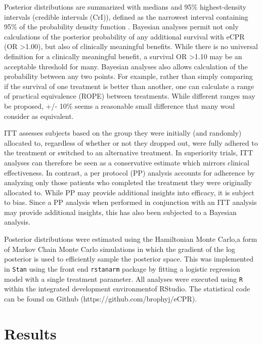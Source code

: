 \documentclass[
  super,
  preprint,
  3p]{elsarticle}
\begin{document}
Posterior distributions are summarized with medians and 95\%
highest-density intervals (credible intervals (CrI)), defined as the
narrowest interval containing 95\% of the probability density function
\citep{mcelreath2020}. Bayesian analyses permit not only calculations of
the posterior probability of any additional survival with eCPR (OR
\textgreater1.00), but also of clinically meaningful benefits. While
there is no universal definition for a clinically meaningful benefit, a
survival OR \textgreater1.10 may be an acceptable threshold for many.
Bayesian analyses also allows calculation of the probability between any
two points. For example, rather than simply comparing if the survival of
one treatment is better than another, one can calculate a range of
practical equivalence (ROPE) between treatments. While different ranges
may be proposed, +/- 10\% seems a reasonable small difference that many
woul consider as equivalent.

ITT assesses subjects based on the group they were initially (and
randomly) allocated to, regardless of whether or not they dropped out,
were fully adhered to the treatment or switched to an alternative
treatment. In superiority trials, ITT analyses can therefore be seen as
a conservative estimate which mirrors clinical effectiveness. In
contrast, a per protocol (PP) analysis accounts for adherence by
analyzing only those patients who completed the treatment they were
originally allocated to. While PP may provide additional insights into
efficacy, it is subject to bias. Since a PP analysis when performed in
conjunction with an ITT analysis may provide additional insights, this
has also been subjected to a Bayesian analysis.

Posterior distributions were estimated using the Hamiltonian Monte
Carlo,a form of Markov Chain Monte Carlo simulations in which the
gradient of the log posterior is used to efficiently sample the
posterior space. This was implemented in \texttt{Stan}\citep{stan} using
the front end \texttt{rstanarm} package\citep{rstanarm} by fitting a
logistic regression model with a single treatment parameter. All
analyses were executed using \texttt{R}\citep{R} within the integrated
development environmentof RStudio\citep{Rstudio}. The statistical code
can be found on Github (https://github.com/brophyj/eCPR).

\hypertarget{results}{%
\section{Results}\label{results}}
\end{document}
